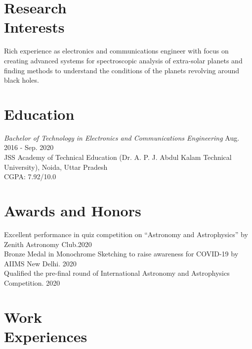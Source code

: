 \documentclass[resmargin, 10pt]{res} %
\begin{document}
\begin{resume}

\section{Research \\Interests}

Rich experience as electronics and communications engineer with focus on creating advanced systems for spectroscopic analysis of extra-solar planets and finding methods to understand the conditions of the planets revolving around black holes.

\section{Education}

{\sl Bachelor of Technology in Electronics and Communications Engineering}  \hfill Aug. 2016 - Sep. 2020 \\
JSS Academy of Technical Education (Dr. A. P. J. Abdul Kalam Technical University), Noida, Uttar Pradesh \\
\tabto{4em}CGPA: 7.92/10.0

\section{Awards and Honors}
Excellent performance in quiz competition on “Astronomy and Astrophysics” by Zenith Astronomy Club.\hfill 2020\\
Bronze Medal in Monochrome Sketching to raise awareness for COVID-19 by AIIMS New Delhi. \hfill 2020\\
Qualified the pre-final round of International Astronomy and Astrophysics Competition. \hfill 2020\\




\section{Work\\Experiences}


\end{resume}
\end{document}
